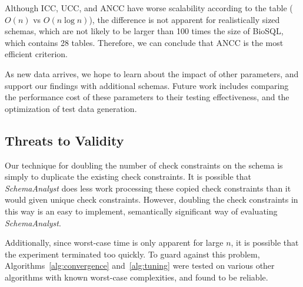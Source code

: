 
Although ICC, UCC, and ANCC have worse scalability according to the
table ($O(n)$ vs $O(n\log n)$), the difference is not apparent for
realistically sized schemas, which are not likely to
be larger than 100 times the size of BioSQL, which contains 28 tables.
Therefore, we can conclude that ANCC is the most efficient criterion.  

As new data arrives, we hope to learn about the impact of other
parameters, and support our findings with additional schemas. 
Future work includes comparing the performance cost of these
parameters to their testing effectiveness, and the optimization of test data generation.
\subsection*{Threats to Validity}

Our technique for doubling the number of check constraints on the schema
is simply to duplicate the existing check constraints. It is possible
that \textit{SchemaAnalyst} does less work processing these copied check
constraints than it would given unique check constraints. However,
doubling the check constraints in this way is an easy to implement,
semantically significant way of evaluating \textit{SchemaAnalyst}.

Additionally, since worst-case time is only apparent for large $n$, 
it is possible that the experiment terminated too quickly.  To guard 
against this problem, Algorithms~\ref{alg:convergence} and~\ref{alg:tuning}
were tested on various other algorithms with known worst-case complexities, and 
found to be reliable.
